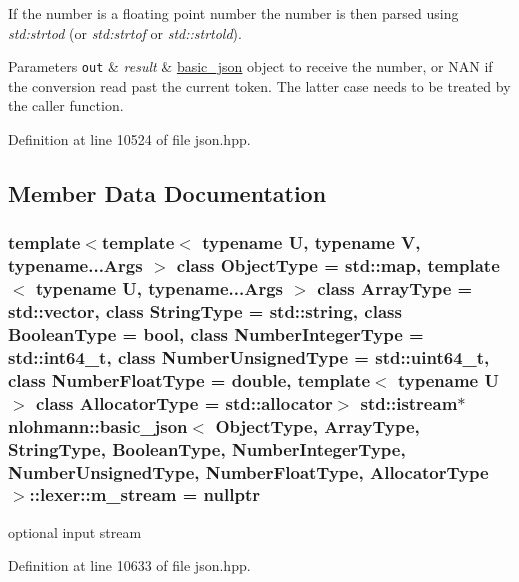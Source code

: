 If the number is a floating point number the number is then parsed using {\itshape std\+:strtod} (or {\itshape std\+:strtof} or {\itshape std\+::strtold}).


\begin{DoxyParams}[1]{Parameters}
\mbox{\tt out}  & {\em result} & \hyperlink{classnlohmann_1_1basic__json}{basic\+\_\+json} object to receive the number, or N\+A\+N if the conversion read past the current token. The latter case needs to be treated by the caller function. \\
\hline
\end{DoxyParams}


Definition at line 10524 of file json.\+hpp.



\subsection{Member Data Documentation}
\hypertarget{classnlohmann_1_1basic__json_1_1lexer_a74c75a6bcb1cbac21bb6f15ef57a5850}{}
\subsubsection[{m\+\_\+stream}]{\setlength{\rightskip}{0pt plus 5cm}template$<$template$<$ typename U, typename V, typename...\+Args $>$ class Object\+Type = std\+::map, template$<$ typename U, typename...\+Args $>$ class Array\+Type = std\+::vector, class String\+Type  = std\+::string, class Boolean\+Type  = bool, class Number\+Integer\+Type  = std\+::int64\+\_\+t, class Number\+Unsigned\+Type  = std\+::uint64\+\_\+t, class Number\+Float\+Type  = double, template$<$ typename U $>$ class Allocator\+Type = std\+::allocator$>$ std\+::istream$\ast$ {\bf nlohmann\+::basic\+\_\+json}$<$ Object\+Type, Array\+Type, String\+Type, Boolean\+Type, Number\+Integer\+Type, Number\+Unsigned\+Type, Number\+Float\+Type, Allocator\+Type $>$\+::lexer\+::m\+\_\+stream = nullptr\hspace{0.3cm}{\ttfamily [private]}}\label{classnlohmann_1_1basic__json_1_1lexer_a74c75a6bcb1cbac21bb6f15ef57a5850}


optional input stream 



Definition at line 10633 of file json.\+hpp.

